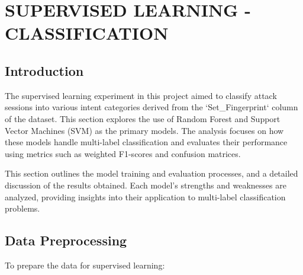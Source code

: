 

\section{SUPERVISED LEARNING - CLASSIFICATION}


    \subsection{Introduction}
    
        The supervised learning experiment in this project aimed to classify attack sessions into various intent categories derived from the `Set\_Fingerprint` column of the dataset. This section explores the use of Random Forest and Support Vector Machines (SVM) as the primary models. The analysis focuses on how these models handle multi-label classification and evaluates their performance using metrics such as weighted F1-scores and confusion matrices.

        This section outlines the model training and evaluation processes, and a detailed discussion of the results obtained. Each model's strengths and weaknesses are analyzed, providing insights into their application to multi-label classification problems.

    \subsection{Data Preprocessing}
    
        To prepare the data for supervised learning:

